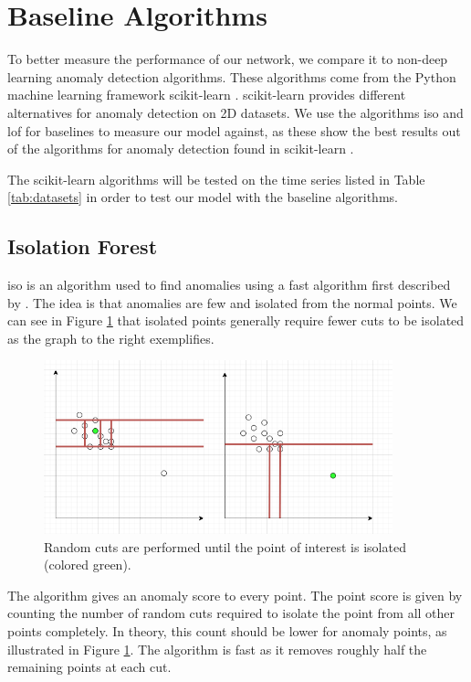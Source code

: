 \section{Baseline Algorithms}
To better measure the performance of our network, we compare it to non-deep learning anomaly detection algorithms. These algorithms come from the Python machine learning framework \gls{scikit-learn} \cite{scikit-learn}. \gls{scikit-learn} provides different alternatives for anomaly detection on 2D datasets. We use the algorithms \gls{iso} and \gls{lof} for baselines to measure our model against, as these show the best results out of the algorithms for anomaly detection found in \gls{scikit-learn} \cite{sklearn-anomaly}. \newline

\noindent
The \gls{scikit-learn} algorithms will be tested on the time series listed in Table \ref{tab:datasets} in order to test our model with the baseline algorithms.

\subsection{Isolation Forest}
\Gls{iso} is an algorithm used to find anomalies using a fast algorithm first described by \cite{isolation_forest}. The idea is that anomalies are few and isolated from the normal points. We can see in Figure \ref{fig:iso} that isolated points generally require fewer cuts to be isolated as the graph to the right exemplifies.

\begin{figure}[htbp]
    \centering
    \includegraphics[width=0.9\textwidth]{Pictures/Sprint_4/isolation_forrest.png}
    \caption{Random cuts are performed until the point of interest is isolated (colored green). }
    \label{fig:iso}
\end{figure}

\noindent
The algorithm gives an anomaly score to every point. The point score is given by counting the number of random cuts required to isolate the point from all other points completely. In theory, this count should be lower for anomaly points, as illustrated in Figure \ref{fig:iso}. The algorithm is fast as it removes roughly half the remaining points at each cut.

